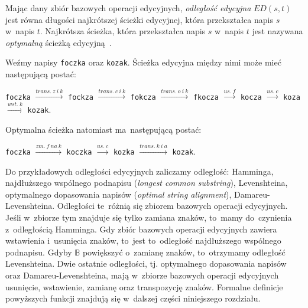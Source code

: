 \documentclass{praca1}
\begin{document}
\begin{definition}
Mając dany zbiór bazowych operacji edycyjnych, \emph{odległość edycyjna} $ED(s,t)$ jest równa długości najkrótszej ścieżki edycyjnej, która przekształca napis $s$ w~napis $t$. Najkrótsza ścieżka, która przekształca napis $s$ w~napis $t$ jest nazywana \emph{optymalną} ścieżką edycyjną~\cite{Boytsov2011:indexingmethods}. 
\end{definition}

\begin{example}
Weźmy napisy \verb|foczka| oraz \verb|kozak|. Ścieżka edycyjna między nimi może mieć następującą postać:

\verb|foczka|  $\xrightarrow{trans.\ z\ i\ k}$ \verb|fockza| $\xrightarrow{trans.\ c\ i\ k}$ \verb|fokcza| $\xrightarrow{trans.\ o\ i\ k}$ \verb|fkocza| $\xrightarrow{us.\ f}$ \verb|kocza| $\xrightarrow{us.\ c}$ \verb|koza| $\xrightarrow{wst.\ k}$ \verb|kozak|.

Optymalna ścieżka natomiast ma~następującą postać:

\verb|foczka| $\xrightarrow{zm.\ f\ na\ k}$ \verb|koczka|  $\xrightarrow{us.\ c}$ \verb|kozka| $\xrightarrow{trans.\ k\ i\ a}$ \verb|kozak|.

\end{example}

Do przykładowych odległości edycyjnych zaliczamy odległość: Hamminga, najdłuższego wspólnego podnapisu (\emph{longest common substring}), Levenshteina, optymalnego dopasowania napisów (\emph{optimal string alignment}), Damareu-Levenshteina. Odległości te~różnią się zbiorem bazowych operacji edycyjnych. Jeśli w~zbiorze tym znajduje się tylko zamiana znaków, to~mamy do~czynienia z~odległością Hamminga. Gdy zbiór bazowych operacji edycyjnych zawiera wstawienia i~usunięcia znaków, to~jest to~odległość najdłuższego wspólnego podnapisu. Gdyby $\mathbb{B}$ powiększyć o~zamianę znaków, to~otrzymamy odległość Levenshteina. Dwie ostatnie odległości, tj. optymalnego dopasowania napisów oraz Damareu-Levenshteina, mają w~zbiorze bazowych operacji edycyjnych usunięcie, wstawienie, zamianę oraz transpozycję znaków. Formalne definicje powyższych funkcji znajdują się w~dalszej części niniejszego rozdziału.
\end{document}
